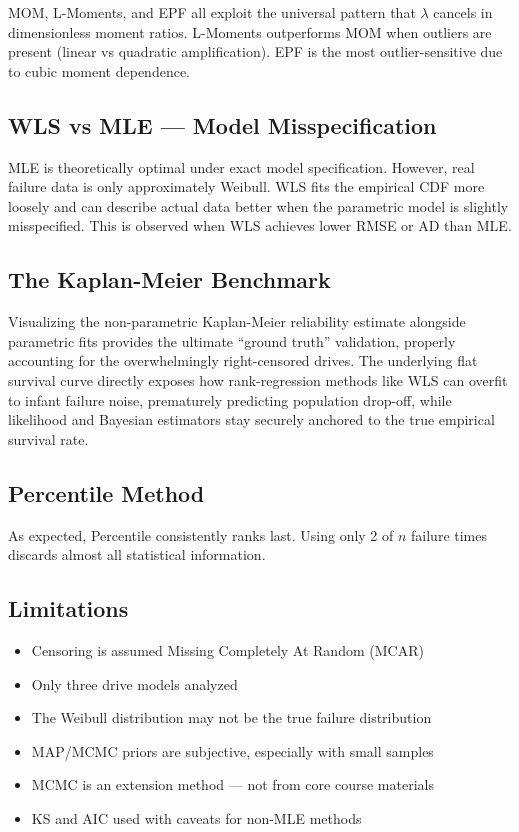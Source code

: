 \documentclass[
]{article}
\providecommand{\tightlist}{%
  \setlength{\itemsep}{0pt}\setlength{\parskip}{0pt}}
\begin{document}
MOM, L-Moments, and EPF all exploit the universal pattern that
\(\lambda\) cancels in dimensionless moment ratios. L-Moments
outperforms MOM when outliers are present (linear vs quadratic
amplification). EPF is the most outlier-sensitive due to cubic moment
dependence.

\subsection{WLS vs MLE --- Model
Misspecification}\label{wls-vs-mle-model-misspecification}

MLE is theoretically optimal under exact model specification. However,
real failure data is only approximately Weibull. WLS fits the empirical
CDF more loosely and can describe actual data better when the parametric
model is slightly misspecified. This is observed when WLS achieves lower
RMSE or AD than MLE.

\subsection{The Kaplan-Meier Benchmark}\label{the-kaplan-meier-benchmark}

Visualizing the non-parametric Kaplan-Meier reliability estimate alongside parametric fits provides the ultimate ``ground truth'' validation, properly accounting for the overwhelmingly right-censored drives. The underlying flat survival curve directly exposes how rank-regression methods like WLS can overfit to infant failure noise, prematurely predicting population drop-off, while likelihood and Bayesian estimators stay securely anchored to the true empirical survival rate.

\subsection{Percentile Method}\label{percentile-method}

As expected, Percentile consistently ranks last. Using only 2 of \(n\)
failure times discards almost all statistical information.

\subsection{Limitations}\label{limitations}

\begin{itemize}
\tightlist
\item
  Censoring is assumed Missing Completely At Random (MCAR)
\item
  Only three drive models analyzed
\item
  The Weibull distribution may not be the true failure distribution
\item
  MAP/MCMC priors are subjective, especially with small samples
\item
  MCMC is an extension method --- not from core course materials
\item
  KS and AIC used with caveats for non-MLE methods
\end{itemize}
\end{document}

